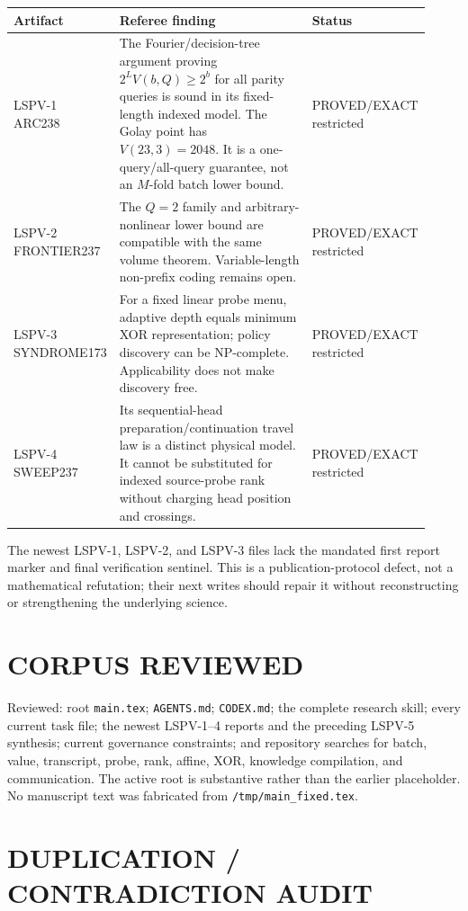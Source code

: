 \documentclass[11pt]{article}
\newcommand{\status}[1]{\textsc{#1}}
\begin{document}
\begin{longtable}{p{0.14\linewidth}p{0.60\linewidth}p{0.18\linewidth}}
\toprule
Artifact & Referee finding & Status\\
\midrule
LSPV-1 ARC238 & The Fourier/decision-tree argument proving $2^LV(b,Q)\ge2^b$ for all parity queries is sound in its fixed-length indexed model.  The Golay point has $V(23,3)=2048$.  It is a one-query/all-query guarantee, not an $M$-fold batch lower bound. & \status{PROVED/EXACT} restricted\\
LSPV-2 FRONTIER237 & The $Q=2$ family and arbitrary-nonlinear lower bound are compatible with the same volume theorem.  Variable-length non-prefix coding remains open. & \status{PROVED/EXACT} restricted\\
LSPV-3 SYNDROME173 & For a fixed linear probe menu, adaptive depth equals minimum XOR representation; policy discovery can be NP-complete.  Applicability does not make discovery free. & \status{PROVED/EXACT} restricted\\
LSPV-4 SWEEP237 & Its sequential-head preparation/continuation travel law is a distinct physical model.  It cannot be substituted for indexed source-probe rank without charging head position and crossings. & \status{PROVED/EXACT} restricted\\
\bottomrule
\end{longtable}

The newest LSPV-1, LSPV-2, and LSPV-3 files lack the mandated first report marker and final verification sentinel.  This is a publication-protocol defect, not a mathematical refutation; their next writes should repair it without reconstructing or strengthening the underlying science.

\section{CORPUS REVIEWED}

Reviewed: root \texttt{main.tex}; \texttt{AGENTS.md}; \texttt{CODEX.md}; the complete research skill; every current task file; the newest LSPV-1--4 reports and the preceding LSPV-5 synthesis; current governance constraints; and repository searches for batch, value, transcript, probe, rank, affine, XOR, knowledge compilation, and communication.  The active root is substantive rather than the earlier placeholder.  No manuscript text was fabricated from \texttt{/tmp/main\_fixed.tex}.

\section{DUPLICATION / CONTRADICTION AUDIT}
\end{document}
